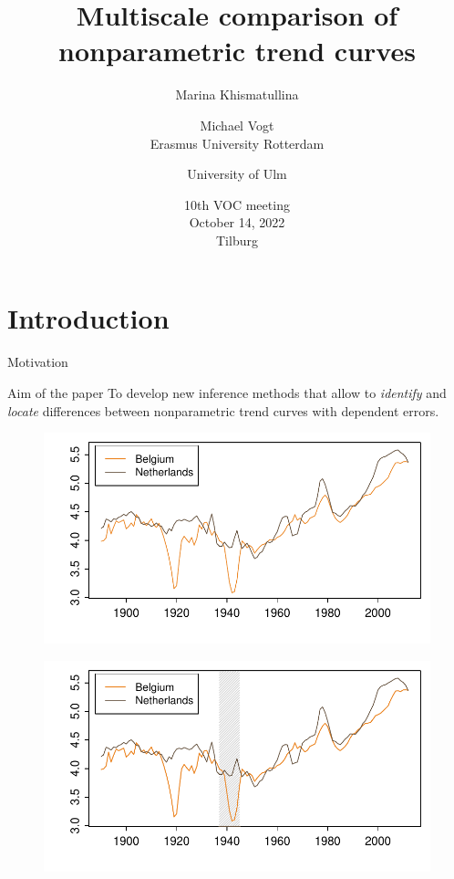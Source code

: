 \documentclass[10pt, handout]{beamer}
\title{Multiscale comparison of nonparametric trend curves}
\date{\vspace{3mm}10th VOC meeting\\ October 14, 2022 \\ Tilburg}
\author{Marina Khismatullina \and \hspace{11mm} Michael Vogt \\ Erasmus University Rotterdam \and University of Ulm}
\begin{document}
\maketitle


\section{Introduction}


\begin{frame}{Motivation}

{ \begin{block}{Aim of the paper}
	To develop new inference methods that allow to \textit{identify} and \textit{locate} differences between nonparametric trend curves with dependent errors.
\end{block}}
	{\begin{figure}
    		\centering
    		\includegraphics[height=0.45\textheight]{plots/hp_BEL_NLD.pdf}
  	\end{figure}}
	{\onslide<3>
	\vspace{-46,81mm}
	\begin{figure}
    		\centering
    		\includegraphics[height=0.45\textheight]{plots/hp_BEL_NLD_1.pdf}

\end{figure}}
\end{frame}
\end{document}
